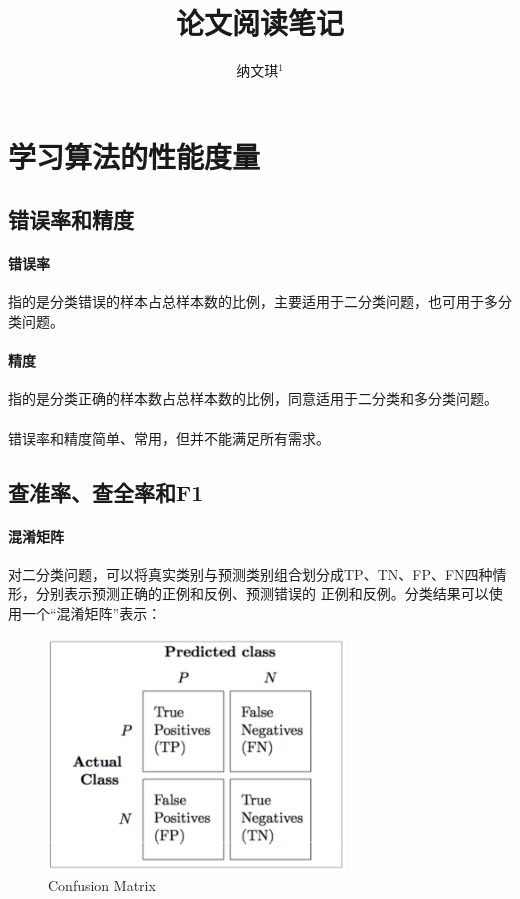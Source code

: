 \documentclass[10pt,letterpaper]{article}
\begin{document}
 


\title{论文阅读笔记}

\author{纳文琪$^{1}$}

\maketitle


\section{学习算法的性能度量\cite{2016机器学习}}
\subsection{错误率和精度}
\paragraph{错误率} 指的是分类错误的样本占总样本数的比例，主要适用于二分类问题，也可用于多分类问题。
\paragraph{精度} 指的是分类正确的样本数占总样本数的比例，同意适用于二分类和多分类问题。
\paragraph{} 错误率和精度简单、常用，但并不能满足所有需求。

\subsection{查准率、查全率和F1}
\paragraph{混淆矩阵} 对二分类问题，可以将真实类别与预测类别组合划分成TP、TN、FP、FN四种情形，分别表示预测正确的正例和反例、预测错误的
正例和反例。分类结果可以使用一个“混淆矩阵”表示：\\
\begin{figure}[H] %
	\centering %
	\includegraphics[width=0.7\textwidth]{../images/confusion_matrix.png} %
	\caption{Confusion Matrix} %
	\label{Fig.main2} %
\end{figure}
\end{document}
